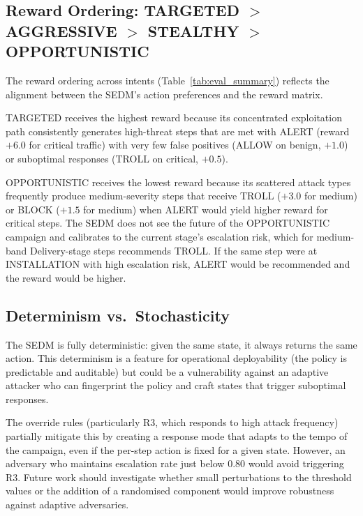 \subsection{Reward Ordering: TARGETED $>$ AGGRESSIVE $>$ STEALTHY $>$ OPPORTUNISTIC}

The reward ordering across intents (Table~\ref{tab:eval_summary}) reflects
the alignment between the SEDM's action preferences and the reward matrix.

TARGETED receives the highest reward because its concentrated exploitation
path consistently generates high-threat steps that are met with ALERT
(reward $+6.0$ for critical traffic) with very few false positives (ALLOW
on benign, $+1.0$) or suboptimal responses (TROLL on critical, $+0.5$).

OPPORTUNISTIC receives the lowest reward because its scattered attack types
frequently produce medium-severity steps that receive TROLL ($+3.0$ for
medium) or BLOCK ($+1.5$ for medium) when ALERT would yield higher reward
for critical steps.
The SEDM does not see the future of the OPPORTUNISTIC campaign and
calibrates to the current stage's escalation risk, which for medium-band
Delivery-stage steps recommends TROLL.
If the same step were at INSTALLATION with high escalation risk, ALERT
would be recommended and the reward would be higher.

\subsection{Determinism vs.\ Stochasticity}

The SEDM is fully deterministic: given the same state, it always returns
the same action.
This determinism is a feature for operational deployability (the policy is
predictable and auditable) but could be a vulnerability against an adaptive
attacker who can fingerprint the policy and craft states that trigger
suboptimal responses.

The override rules (particularly R3, which responds to high attack frequency)
partially mitigate this by creating a response mode that adapts to the tempo
of the campaign, even if the per-step action is fixed for a given state.
However, an adversary who maintains escalation rate just below 0.80 would
avoid triggering R3.
Future work should investigate whether small perturbations to the threshold
values or the addition of a randomised component would improve robustness
against adaptive adversaries.

